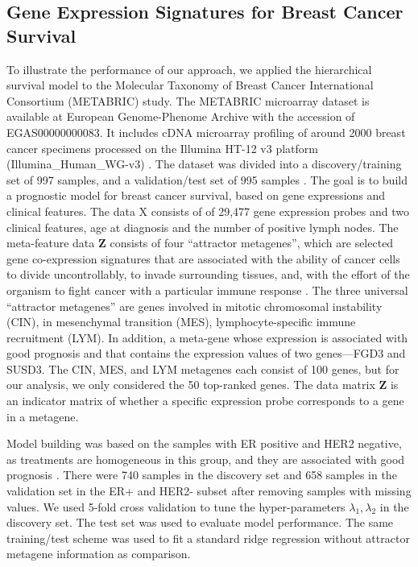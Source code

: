 \subsection{Gene Expression Signatures for Breast Cancer Survival}
To illustrate the performance of our approach, we applied the hierarchical survival model to the Molecular Taxonomy of Breast Cancer International Consortium (METABRIC) study. The METABRIC microarray dataset is available at European Genome-Phenome Archive with the accession of EGAS00000000083. It includes cDNA microarray profiling of around 2000 breast cancer specimens processed on the Illumina HT-12 v3 platform (Illumina\_Human\_WG-v3) \citep{curtis2012genomic}. The dataset was divided into a discovery/training set of 997 samples, and a validation/test set of 995 samples \citep{cheng2013development}. The goal is to build a prognostic model for breast cancer survival, based on gene expressions and clinical features. The data X consists of of 29,477 gene expression probes and two clinical features, age at diagnosis and the number of positive lymph nodes. The meta-feature data $\bm{Z}$ consists of four ``attractor metagenes'', which are selected gene co-expression signatures that are associated with the ability of cancer cells to divide uncontrollably, to invade surrounding tissues, and, with the effort of the organism to fight cancer with a particular immune response \citep{cheng2013biomolecular}. The three universal “attractor metagenes” are genes involved in mitotic chromosomal instability (CIN), in mesenchymal transition (MES), lymphocyte-specific immune recruitment (LYM). In addition, a meta-gene whose expression is associated with good prognosis and that contains the expression values of two genes—FGD3 and SUSD3. The CIN, MES, and LYM metagenes each consist of 100 genes, but for our analysis, we only considered the 50 top-ranked genes. The data matrix $\bm{Z}$ is an indicator matrix of whether a specific expression probe corresponds to a gene in a metagene. 

Model building was based on the samples with ER positive and HER2 negative, as treatments are homogeneous in this group, and they are associated with good prognosis \citep{rivenbark2013molecular}. There were 740 samples in the discovery set and 658 samples in the validation set in the ER+ and HER2- subset after removing samples with missing values. We used 5-fold cross validation to tune the hyper-parameters $\lambda_1,\lambda_2$ in the discovery set. The test set was used to evaluate model performance. The same training/test scheme was used to fit a standard ridge regression without attractor metagene information as comparison. 

